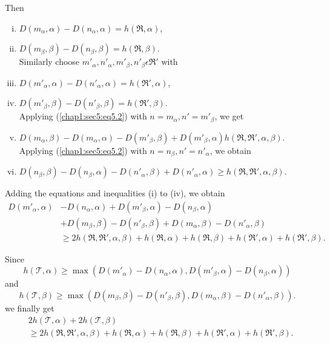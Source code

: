 Then
\begin{enumerate}[(i)]
\item $D(m_{\alpha}, \alpha) - D(n_{\alpha}, \alpha) = h(\mathfrak{R}, \alpha)$,\\
\item $D(m_{\beta}, \beta) - D(n_{\beta}, \beta) = h(\mathfrak{R}, \beta)$.\\

Similarly choose $m'_{\alpha}, n'_{\alpha},m'_{\beta}, n'_{\beta} \epsilon \mathfrak{R}'$ with\\
\item $D(m'_{\alpha}, \alpha) - D(n'_{\alpha}, \alpha) = h(\mathfrak{R}', \alpha)$,\\
\item $D(m'_{\beta}, \beta) - D(n'_{\beta}, \beta) = h(\mathfrak{R}', \beta)$.\\

Applying (\ref{chap1:sec5:eq5.2}) with $n = m_{\alpha}, n' = m'_{\beta}$, we get\\
\item $D(m_{\alpha}, \beta) - D(m_{\alpha}, \alpha) - D(m'_{\beta}, \beta) + D(m'_{\beta}, \alpha) h(\mathfrak{R}, \mathfrak{R}', \alpha, \beta).$\\

Applying (\ref{chap1:sec5:eq5.2}) with $n = n_{\beta}, n' = n'_{\alpha}$, we obtain\\
\item $D(n_{\beta}, \beta) - D(n_{\beta}, \alpha) - D(n'_{\alpha}, \beta) + D(n'_{\alpha}, \alpha) \geq h(\mathfrak{R}, \mathfrak{R}', \alpha, \beta)$.
\end{enumerate}

Adding the equations and inequalities (i) to (iv), we obtain
\begin{align*}
D(m'_{\alpha}, \alpha) & - D(n_{\alpha}, \alpha) + D(m'_{\beta}, \alpha) - D(n_{\beta}, \alpha)\\ 
& + D(m_{\beta}, \beta) - D(n'_{\beta}, \beta) + D(m_{\alpha}, \beta) - D(n'_{\alpha}, \beta)\\ 
& \geq 2h(\mathfrak{R}, \mathfrak{R}', \alpha, \beta) + h(\mathfrak{R}, \alpha) + h(\mathfrak{R}, \beta) + h(\mathfrak{R}', \alpha) + h(\mathfrak{R}', \beta).
\end{align*}\pageoriginale

Since
$$
h(\mathscr{T}, \alpha) \geq \max(D(m'_{\alpha}) - D(n_{\alpha}, \alpha), D(m'_{\beta}, \alpha) - D(n_{\beta}, \alpha))
$$
and
$$
h(\mathscr{T}, \beta) \geq \max (D(m_{\beta}, \beta) - D(n'_{\beta}, \beta), D(m_{\alpha}, \beta) - D(n'_{\alpha}, \beta)).
$$
we finally get
\begin{align*}
& 2h(\mathscr{T}, \alpha) + 2h(\mathscr{T}, \beta)\\
& \geq 2h(\mathfrak{R}, \mathfrak{R}', \alpha, \beta) + h(\mathfrak{R}, \alpha) + h(\mathfrak{R}, \beta) + h(\mathfrak{R}', \alpha) + h(\mathfrak{R}', \beta).
\end{align*}

